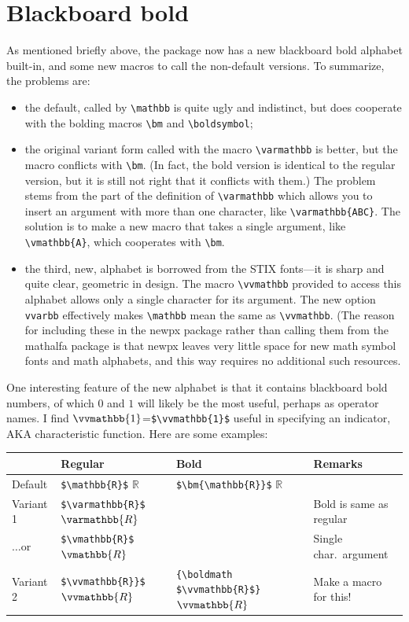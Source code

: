 \documentclass[11pt]{article}
\theoremstyle{oldplain}
\theoremstyle{plain}
\begin{document}
\section{Blackboard bold}
As mentioned briefly above, the package now has a new blackboard bold alphabet built-in, and some new macros to call the non-default versions. To summarize, the problems are:
\begin{itemize}
\item
the default, called by \verb|\mathbb| is quite ugly and indistinct, but does cooperate with the bolding macros \verb|\bm| and \verb|\boldsymbol|;
\item the original variant form called with the macro \verb|\varmathbb| is better, but the macro conflicts with \verb|\bm|. (In fact, the bold version is identical to the regular version, but it is still not right that it conflicts with them.) The problem stems from the part of the definition of \verb|\varmathbb| which allows you to insert an argument with more than one character, like \verb|\varmathbb{ABC}|. The solution is to make a new macro that takes a single argument, like \verb|\vmathbb{A}|, which cooperates with \verb|\bm|.
\item the third, new, alphabet is borrowed from the STIX fonts---it is sharp and quite clear, geometric in design. The macro \verb|\vvmathbb| provided to access this alphabet allows only a single character for its argument. The new option {\tt vvarbb} effectively makes \verb|\mathbb| mean the same as \verb|\vvmathbb|.
(The reason for including these in the \textsf{newpx} package rather than calling them from the \textsf{mathalfa} package is that \textsf{newpx} leaves very little space for new math symbol fonts and math alphabets, and this way requires no additional such resources.
\end{itemize}
One interesting feature of the new alphabet is that it contains blackboard bold numbers, of which $0$ and $1$ will likely be the most useful, perhaps as operator names. I find $\vvmathbb{1}$=\verb|$\vvmathbb{1}$| useful in specifying an indicator, AKA characteristic function. Here are some examples:

\begin{center}
  \begin{tabular}{@{} llll @{}}
    \toprule
     & Regular & Bold & Remarks \\ 
    \midrule
Default  & \verb|$\mathbb{R}$| $\mathbb{R}$& \verb|$\bm{\mathbb{R}}$| $\bm{\mathbb{R}}$\\ 
Variant 1     & \verb|$\varmathbb{R}$| $\varmathbb{R}$ &  & Bold is same as regular \\ 
$\dots$or     & \verb|$\vmathbb{R}$| $\vmathbb{R}$ &  & Single char.\ argument\\ 
Variant 2 & \verb|$\vvmathbb{R}}$| $\vvmathbb{R}$& \verb|{\boldmath $\vvmathbb{R}$}| {\boldmath $\vvmathbb{R}$} & Make a macro for this! \\ 
    \bottomrule
  \end{tabular}
\end{center}
\end{document}
